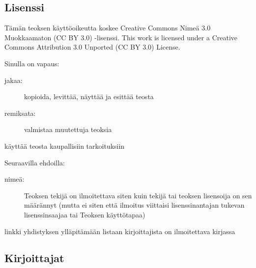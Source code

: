 \subsection*{Lisenssi}

Tämän teoksen käyttöoikeutta koskee Creative Commons Nimeä 3.0 Muokkaamaton (CC BY 3.0) -lisenssi.
This work is licensed under a Creative Commons Attribution 3.0 Unported (CC BY 3.0) License.


Sinulla on vapaus:
\begin{description}
\item[jakaa:] kopioida, levittää, näyttää ja esittää teosta
\item[remiksata:] valmistaa muutettuja teoksia
\item[käyttää teosta kaupallisiin tarkoituksiin]
\end{description}
Seuraavilla ehdoilla:
\begin{description}
\item[nimeä:] Teoksen tekijä on ilmoitettava siten kuin tekijä tai teoksen lisensoija on sen määrännyt (mutta ei siten että ilmoitus viittaisi lisenssinantajan tukevan lisenssinsaajaa tai Teoksen käyttötapaa)
\item[linkki yhdistyksen ylläpitämään listaan kirjoittajista on ilmoitettava kirjassa]
\end{description}

\subsection*{Kirjoittajat}
